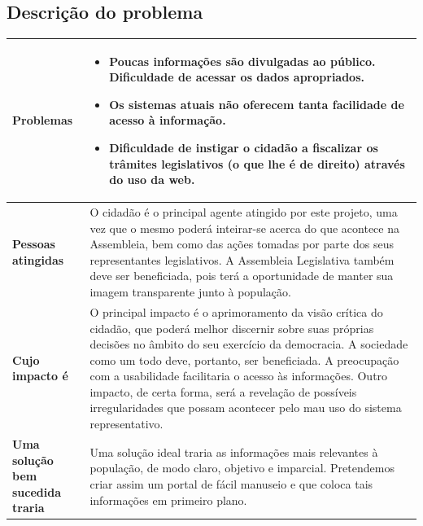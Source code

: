 \documentclass[12pt, a4paper]{article}
\begin{document}
        \subsection{Descrição do problema}
            \begin{longtabu}{X[-1] | X}
                \hline

                \textbf{Problemas} &
                \begin{minipage}[t]{\linewidth}
                \begin{itemize}[itemsep=.5ex,parsep=.0ex,after=\strut,leftmargin=15pt]
                \item
                Poucas informações são divulgadas ao público. Dificuldade de
                acessar os dados apropriados.
                \item
                Os sistemas atuais não oferecem tanta facilidade de acesso à
                informação.
                \item
                Dificuldade de instigar o cidadão a fiscalizar os trâmites
                legislativos (o que lhe é de direito) através do uso da web.
                \end{itemize}
                \end{minipage}
                \\ \hline

                \textbf{Pessoas atingidas} &
                O cidadão é o principal agente atingido por este projeto, uma
                vez que o mesmo poderá inteirar-se acerca do que acontece na
                Assembleia, bem como das ações tomadas por parte dos seus
                representantes legislativos. A Assembleia Legislativa também
                deve ser beneficiada, pois terá a oportunidade de manter sua
                imagem transparente junto à população.
                \\ \hline

                \textbf{Cujo impacto é} &
                O principal impacto é o aprimoramento da visão crítica do
                cidadão, que poderá melhor discernir sobre suas próprias
                decisões no âmbito do seu exercício da democracia. A sociedade
                como um todo deve, portanto, ser beneficiada. A preocupação com
                a usabilidade facilitaria o acesso às informações.  Outro
                impacto, de certa forma, será a revelação de possíveis
                irregularidades que possam acontecer pelo mau uso do sistema
                representativo.
                \\ \hline

                \textbf{Uma solução \newline bem sucedida traria} &
                Uma solução ideal traria as informações mais relevantes à
                população, de modo claro, objetivo e imparcial. Pretendemos
                criar assim um portal de fácil manuseio e que coloca tais
                informações em primeiro plano.
                \\ \hline

            \end{longtabu}
\end{document}
